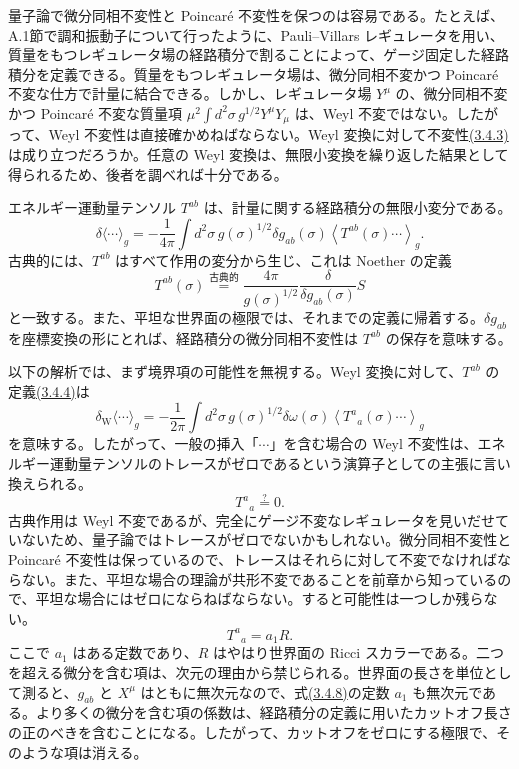 量子論で微分同相不変性と Poincaré 不変性を保つのは容易である。たとえば、A.1節で調和振動子について行ったように、Pauli--Villars レギュレータを用い、質量をもつレギュレータ場の経路積分で割ることによって、ゲージ固定した経路積分を定義できる。質量をもつレギュレータ場は、微分同相不変かつ Poincaré 不変な仕方で計量に結合できる。しかし、レギュレータ場 $Y^\mu$ の、微分同相不変かつ Poincaré 不変な質量項 $\mu^2\int d^2\sigma\,g^{1/2}Y^\mu Y_\mu$ は、Weyl 不変ではない。したがって、Weyl 不変性は直接確かめねばならない。Weyl 変換に対して不変性\hyperref[eq:3.4.3]{(3.4.3)}は成り立つだろうか。任意の Weyl 変換は、無限小変換を繰り返した結果として得られるため、後者を調べれば十分である。

エネルギー運動量テンソル $T^{ab}$ は、計量に関する経路積分の無限小変分である。
\begin{equation}
\delta\langle\cdots\rangle_g
=-\frac1{4\pi}\int d^2\sigma\,g(\sigma)^{1/2}
\delta g_{ab}(\sigma)\left\langle T^{ab}(\sigma)\cdots\right\rangle_g.
\tag{3.4.4}\label{eq:3.4.4}
\end{equation}
古典的には、$T^{ab}$ はすべて作用の変分から生じ、これは Noether の定義
\begin{equation}
T^{ab}(\sigma)\overset{\text{古典的}}{=}
\frac{4\pi}{g(\sigma)^{1/2}}
\frac{\delta}{\delta g_{ab}(\sigma)}S
\tag{3.4.5}\label{eq:3.4.5}
\end{equation}
と一致する。また、平坦な世界面の極限では、それまでの定義に帰着する。$\delta g_{ab}$ を座標変換の形にとれば、経路積分の微分同相不変性は $T^{ab}$ の保存を意味する。

以下の解析では、まず境界項の可能性を無視する。Weyl 変換に対して、$T^{ab}$ の定義\hyperref[eq:3.4.4]{(3.4.4)}は
\begin{equation}
\delta_{\mathrm W}\langle\cdots\rangle_g
=-\frac1{2\pi}\int d^2\sigma\,g(\sigma)^{1/2}
\delta\omega(\sigma)\left\langle T^a{}_a(\sigma)\cdots\right\rangle_g
\tag{3.4.6}\label{eq:3.4.6}
\end{equation}
を意味する。したがって、一般の挿入「$\cdots$」を含む場合の Weyl 不変性は、エネルギー運動量テンソルのトレースがゼロであるという演算子としての主張に言い換えられる。
\begin{equation}
T^a{}_a\overset{?}{=}0.
\tag{3.4.7}\label{eq:3.4.7}
\end{equation}
古典作用は Weyl 不変であるが、完全にゲージ不変なレギュレータを見いだせていないため、量子論ではトレースがゼロでないかもしれない。微分同相不変性と Poincaré 不変性は保っているので、トレースはそれらに対して不変でなければならない。また、平坦な場合の理論が共形不変であることを前章から知っているので、平坦な場合にはゼロにならねばならない。すると可能性は一つしか残らない。
\begin{equation}
T^a{}_a=a_1R.
\tag{3.4.8}\label{eq:3.4.8}
\end{equation}
ここで $a_1$ はある定数であり、$R$ はやはり世界面の Ricci スカラーである。二つを超える微分を含む項は、次元の理由から禁じられる。世界面の長さを単位として測ると、$g_{ab}$ と $X^\mu$ はともに無次元なので、式\hyperref[eq:3.4.8]{(3.4.8)}の定数 $a_1$ も無次元である。より多くの微分を含む項の係数は、経路積分の定義に用いたカットオフ長さの正のべきを含むことになる。したがって、カットオフをゼロにする極限で、そのような項は消える。

